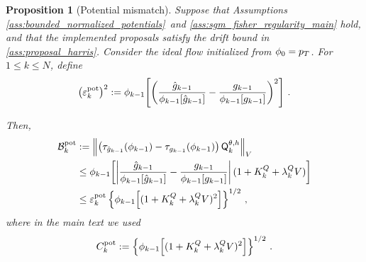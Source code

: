 \documentclass[11pt]{article}
\theoremstyle{plain}
\newtheorem{proposition}[theorem]{Proposition}
\theoremstyle{definition}
\theoremstyle{remark}
\begin{document}
\begin{proposition}[Potential mismatch]
\label{prop:potential_mismatch_control}
Suppose that Assumptions \ref{ass:bounded_normalized_potentials} and \ref{ass:sgm_fisher_regularity_main} hold, and that the implemented proposals satisfy the drift bound in \ref{ass:proposal_harris}. Consider the ideal flow initialized from $\filter{0}=p_T$.
For $1\le k\le N$, define
\begin{equation}
\label{eq:normalized_potential_error}
\bigl(\varepsilon_k^{\rm pot}\bigr)^2
\eqdef
\filter{k-1}\!\left[ \left( \frac{\approxpot{k-1}}{\filter{k-1}[\approxpot{k-1}]} - \frac{\pot{k-1}} {\filter{k-1}[\pot{k-1}]} \right)^2 \right] \eqsp.
\end{equation}

Then,
\begin{align}
\mathcal B_k^{\rm pot}
&\eqdef \vnorm[ \left( \tau_{\approxpot{k-1}}(\filter{k-1}) - \tau_{\pot{k-1}}(\filter{k-1}) \right) \mk{k}[\theta,h]][V] \nonumber\\
&\le \filter{k-1}\!\left[ \left| \frac{\approxpot{k-1}} {\filter{k-1}[\approxpot{k-1}]} - \frac{\pot{k-1}}{\filter{k-1}[\pot{k-1}]} \right| (1+K_k^Q+\lambda_k^Q V) \right] \label{eq:potential_bias_weighted_bound}\\
&\le \varepsilon_k^{\rm pot}   \left\{ \filter{k-1}\!\left[ (1+K_k^Q+\lambda_k^Q V)^2 \right] \right\}^{1/2}\eqsp, \label{eq:potential_bias_l2_bound}
\end{align}
where in the main text we used
$$
C_k^{\rm pot} \eqdef \left\{ \filter{k-1}\!\left[ (1+K_k^Q+\lambda_k^Q V)^2 \right] \right\}^{1/2} \eqsp.
$$
\end{proposition}
\end{document}
